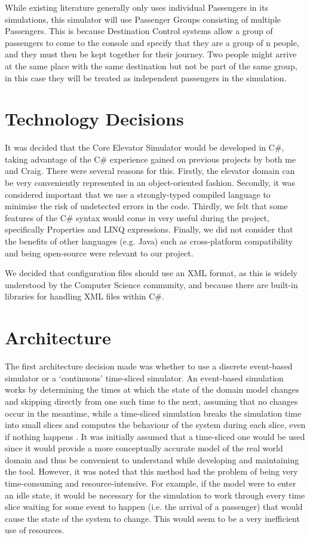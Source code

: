 \documentclass{UoYCSproject}
\begin{document}
While existing literature generally only uses individual Passengers in its simulations, this simulator will use Passenger Groups consisting of multiple Passengers.  This is because Destination Control systems allow a group of passengers to come to the console and specify that they are a group of n people, and they must then be kept together for their journey.  Two people might arrive at the same place with the same destination but not be part of the same group, in this case they will be treated as independent passengers in the simulation.

\section{Technology Decisions}

It was decided that the Core Elevator Simulator would be developed in C\#, taking advantage of the C\# experience gained on previous projects by both me and Craig.  There were several reasons for this.  Firstly, the elevator domain can be very conveniently represented in an object-oriented fashion.  Secondly, it was considered important that we use a strongly-typed compiled language to minimise the risk of undetected errors in the code.  Thirdly, we felt that some features of the C\# syntax would come in very useful during the project, specifically Properties and LINQ expressions.  Finally, we did not consider that the benefits of other languages (e.g. Java) such as cross-platform compatibility and being open-source were relevant to our project.

We decided that configuration files should use an XML format, as this is widely understood by the Computer Science community, and because there are built-in libraries for handling XML files within C\#.

\section{Architecture}

The first architecture decision made was whether to use a discrete event-based simulator or a `continuous' time-sliced simulator.  An event-based simulation works by determining the times at which the state of the domain model changes and skipping directly from one such time to the next, assuming that no changes occur in the meantime, while a time-sliced simulation breaks the simulation time into small slices and computes the behaviour of the system during each slice, even if nothing happens \citep{Matloff2008}.  It was initially assumed that a time-sliced one would be used since it would provide a more conceptually accurate model of the real world domain and thus be convenient to understand while developing and maintaining the tool.  However, it was noted that this method had the problem of being very time-consuming and resource-intensive.  For example, if the model were to enter an idle state, it would be necessary for the simulation to work through every time slice waiting for some event to happen (i.e. the arrival of a passenger) that would cause the state of the system to change.  This would seem to be a very inefficient use of resources.
\end{document}

